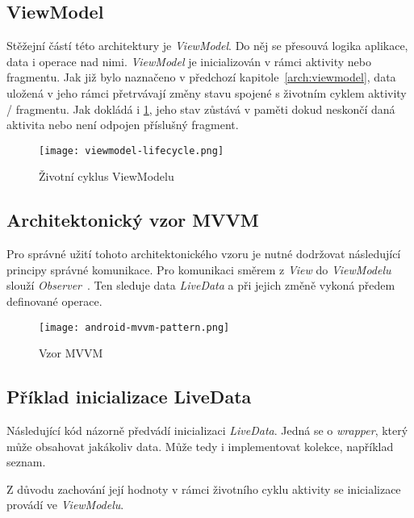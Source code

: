         \subsection{ViewModel}
        Stěžejní částí této architektury je \emph{ViewModel}. Do něj se přesouvá logika aplikace, data i operace nad nimi. \emph{ViewModel} je inicializován v rámci aktivity nebo fragmentu. Jak již bylo naznačeno v předchozí kapitole~\ref{arch:viewmodel}, data uložená v jeho rámci přetrvávají změny stavu spojené s životním cyklem aktivity / fragmentu. Jak dokládá i \ref{diagram:viewmodel_lifecycle}, jeho stav zůstává v paměti dokud neskončí daná aktivita nebo není odpojen příslušný fragment.

        \begin{figure}[h!]
            \centering
            \texttt{[image: viewmodel-lifecycle.png]}
            \caption[Životní cyklus ViewModelu]{Životní cyklus ViewModelu\cite{viewmodel-lifecycle}}
            \label{diagram:viewmodel_lifecycle}
        \end{figure}

        \newpage
        \subsection{Architektonický vzor MVVM}
        Pro správné užití tohoto architektonického vzoru je nutné dodržovat následující principy správné komunikace. Pro komunikaci směrem z \emph{View} do \emph{ViewModelu} slouží \emph{Observer}~\cite{livedata}. Ten sleduje data \emph{LiveData} a při jejich změně vykoná předem definované operace.

        \begin{figure}[h!]
            \centering
            \texttt{[image: android-mvvm-pattern.png]}
            \caption[Vzor MVVM]{Vzor MVVM~\cite{mvvm-pattern}}
            \label{diagram:mvvm_pattern}
        \end{figure}

        \subsection{Příklad inicializace LiveData}
        Následující kód názorně předvádí inicializaci \emph{LiveData}. Jedná se o \emph{wrapper}, který může obsahovat jakákoliv data. Může tedy i implementovat kolekce, například seznam.

        Z důvodu zachování její hodnoty v rámci životního cyklu aktivity se inicializace provádí ve \emph{ViewModelu}.

